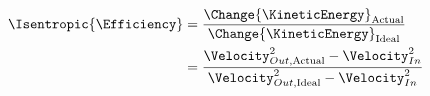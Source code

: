 \begin{equation}\label{eq:Isentropic_Efficiency-Nozzle}
  \begin{aligned}
    \Isentropic{\Efficiency} &= \frac{\Change{\KineticEnergy}_{\text{Actual}}}{\Change{\KineticEnergy}_{\text{Ideal}}} \\
    &= \frac{\Velocity_{Out, \text{Actual}}^{2} - \Velocity_{In}^{2}}{\Velocity_{Out, \text{Ideal}}^{2} - \Velocity_{In}^{2}}
  \end{aligned}
\end{equation}

